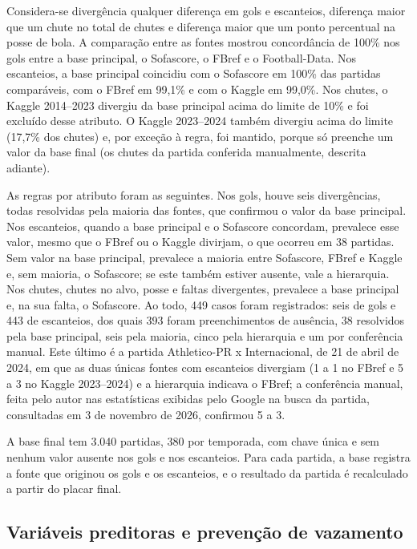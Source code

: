 Considera-se divergência qualquer diferença em gols e escanteios, diferença maior que um chute no total de chutes e diferença maior que um ponto percentual na posse de bola. A comparação entre as fontes mostrou concordância de 100\% nos gols entre a base principal, o Sofascore, o FBref e o Football-Data. Nos escanteios, a base principal coincidiu com o Sofascore em 100\% das partidas comparáveis, com o FBref em 99,1\% e com o Kaggle em 99,0\%. Nos chutes, o Kaggle 2014--2023 divergiu da base principal acima do limite de 10\% e foi excluído desse atributo. O Kaggle 2023--2024 também divergiu acima do limite (17,7\% dos chutes) e, por exceção à regra, foi mantido, porque só preenche um valor da base final (os chutes da partida conferida manualmente, descrita adiante).

As regras por atributo foram as seguintes. Nos gols, houve seis divergências, todas resolvidas pela maioria das fontes, que confirmou o valor da base principal. Nos escanteios, quando a base principal e o Sofascore concordam, prevalece esse valor, mesmo que o FBref ou o Kaggle divirjam, o que ocorreu em 38 partidas. Sem valor na base principal, prevalece a maioria entre Sofascore, FBref e Kaggle e, sem maioria, o Sofascore; se este também estiver ausente, vale a hierarquia. Nos chutes, chutes no alvo, posse e faltas divergentes, prevalece a base principal e, na sua falta, o Sofascore. Ao todo, 449 casos foram registrados: seis de gols e 443 de escanteios, dos quais 393 foram preenchimentos de ausência, 38 resolvidos pela base principal, seis pela maioria, cinco pela hierarquia e um por conferência manual. Este último é a partida Athletico-PR x Internacional, de 21 de abril de 2024, em que as duas únicas fontes com escanteios divergiam (1 a 1 no FBref e 5 a 3 no Kaggle 2023--2024) e a hierarquia indicava o FBref; a conferência manual, feita pelo autor nas estatísticas exibidas pelo Google na busca da partida, consultadas em 3 de novembro de 2026, confirmou 5 a 3.

A base final tem 3.040 partidas, 380 por temporada, com chave única e sem nenhum valor ausente nos gols e nos escanteios. Para cada partida, a base registra a fonte que originou os gols e os escanteios, e o resultado da partida é recalculado a partir do placar final.

\subsection{Variáveis preditoras e prevenção de vazamento}\label{subsec:Features}

